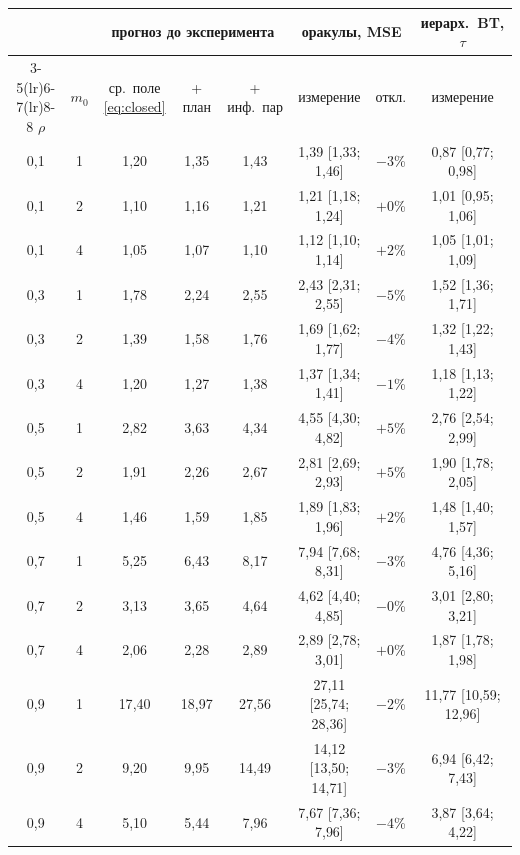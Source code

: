 \begin{tabular}{cc ccc cc c}
\toprule
& & \multicolumn{3}{c}{прогноз до эксперимента} & \multicolumn{2}{c}{оракулы, MSE} & иерарх.\ BT, $\tau$ \\
\cmidrule(lr){3-5}\cmidrule(lr){6-7}\cmidrule(lr){8-8}
$\rho$ & $m_0$ & ср.\ поле \eqref{eq:closed} & + план & + инф.\ пар & измерение & откл. & измерение \\
\midrule
0{,}1 & 1 & 1{,}20 & 1{,}35 & 1{,}43 & 1{,}39 \scriptsize[1{,}33; 1{,}46] & $-3$\% & 0{,}87 \scriptsize[0{,}77; 0{,}98] \\
0{,}1 & 2 & 1{,}10 & 1{,}16 & 1{,}21 & 1{,}21 \scriptsize[1{,}18; 1{,}24] & $+0$\% & 1{,}01 \scriptsize[0{,}95; 1{,}06] \\
0{,}1 & 4 & 1{,}05 & 1{,}07 & 1{,}10 & 1{,}12 \scriptsize[1{,}10; 1{,}14] & $+2$\% & 1{,}05 \scriptsize[1{,}01; 1{,}09] \\
0{,}3 & 1 & 1{,}78 & 2{,}24 & 2{,}55 & 2{,}43 \scriptsize[2{,}31; 2{,}55] & $-5$\% & 1{,}52 \scriptsize[1{,}36; 1{,}71] \\
0{,}3 & 2 & 1{,}39 & 1{,}58 & 1{,}76 & 1{,}69 \scriptsize[1{,}62; 1{,}77] & $-4$\% & 1{,}32 \scriptsize[1{,}22; 1{,}43] \\
0{,}3 & 4 & 1{,}20 & 1{,}27 & 1{,}38 & 1{,}37 \scriptsize[1{,}34; 1{,}41] & $-1$\% & 1{,}18 \scriptsize[1{,}13; 1{,}22] \\
0{,}5 & 1 & 2{,}82 & 3{,}63 & 4{,}34 & 4{,}55 \scriptsize[4{,}30; 4{,}82] & $+5$\% & 2{,}76 \scriptsize[2{,}54; 2{,}99] \\
0{,}5 & 2 & 1{,}91 & 2{,}26 & 2{,}67 & 2{,}81 \scriptsize[2{,}69; 2{,}93] & $+5$\% & 1{,}90 \scriptsize[1{,}78; 2{,}05] \\
0{,}5 & 4 & 1{,}46 & 1{,}59 & 1{,}85 & 1{,}89 \scriptsize[1{,}83; 1{,}96] & $+2$\% & 1{,}48 \scriptsize[1{,}40; 1{,}57] \\
0{,}7 & 1 & 5{,}25 & 6{,}43 & 8{,}17 & 7{,}94 \scriptsize[7{,}68; 8{,}31] & $-3$\% & 4{,}76 \scriptsize[4{,}36; 5{,}16] \\
0{,}7 & 2 & 3{,}13 & 3{,}65 & 4{,}64 & 4{,}62 \scriptsize[4{,}40; 4{,}85] & $-0$\% & 3{,}01 \scriptsize[2{,}80; 3{,}21] \\
0{,}7 & 4 & 2{,}06 & 2{,}28 & 2{,}89 & 2{,}89 \scriptsize[2{,}78; 3{,}01] & $+0$\% & 1{,}87 \scriptsize[1{,}78; 1{,}98] \\
0{,}9 & 1 & 17{,}40 & 18{,}97 & 27{,}56 & 27{,}11 \scriptsize[25{,}74; 28{,}36] & $-2$\% & 11{,}77 \scriptsize[10{,}59; 12{,}96] \\
0{,}9 & 2 & 9{,}20 & 9{,}95 & 14{,}49 & 14{,}12 \scriptsize[13{,}50; 14{,}71] & $-3$\% & 6{,}94 \scriptsize[6{,}42; 7{,}43] \\
0{,}9 & 4 & 5{,}10 & 5{,}44 & 7{,}96 & 7{,}67 \scriptsize[7{,}36; 7{,}96] & $-4$\% & 3{,}87 \scriptsize[3{,}64; 4{,}22] \\
\bottomrule
\end{tabular}
